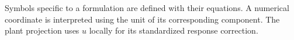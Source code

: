 \documentclass[12pt,twoside]{book}
\begin{document}
Symbols specific to a formulation are defined with their equations. A numerical coordinate is interpreted using the unit of its corresponding component. The plant projection uses $u$ locally for its standardized response correction.

\mainmatter
\pagestyle{headings}
\renewcommand{\chaptermark}[1]{\markboth{\chaptername\ \thechapter}{\chaptername\ \thechapter}}
\renewcommand{\sectionmark}[1]{}









\backmatter


\end{document}

